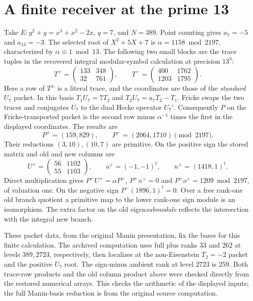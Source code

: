 \documentclass[11pt]{article}
\begin{document}
\section{A finite receiver at the prime 13}
Take $E:y^2+y=x^3+x^2-2x$, $q=7$, and $N=389$. Point counting gives
$a_7=-5$ and $a_{13}=-3$. The selected root of $X^2+5X+7$ is
$\alpha=1158\bmod 2197$, characterized by $\alpha\equiv1\bmod13$.
The following two small blocks are the trace tuples in the recovered
integral modular-symbol calculation at precision $13^3$:
\[
 T^+=\begin{pmatrix}133&348\\32&761\end{pmatrix},\qquad
 T^-=\begin{pmatrix}400&1762\\1203&1795\end{pmatrix}.
\]
Here a row of $T^\pm$ is a literal trace, and the coordinates
are those of the \emph{standard} $U_7$ packet. In this basis
$T_1U_7=7T_2$ and $T_2U_7=a_7T_2-T_1$. Fricke swaps the two traces
and conjugates $U_7$ to the dual Hecke operator $U_7'$. Consequently
$P$ on the Fricke-transported packet is the second row minus
$\alpha^{-1}$ times the first in the displayed coordinates. The results
are
\[
 P^+=(159,829),\qquad P^-=(2064,1710)\pmod {2197}.
\]
Their reductions $(3,10),(10,7)$ are primitive. On the positive
sign the stored matrix and old and new columns are
\[
 U^+=\begin{pmatrix}56&1102\\55&1103\end{pmatrix},\qquad
 o^+=(-1,-1)^t,\qquad n^+=(1418,1)^t .
\]
Direct multiplication gives $P^+U^+=\alpha P^+$, $P^+n^+=0$ and
$P^+o^+=1209\bmod2197$, of valuation one. On the negative sign
$P^-(1896,1)^t=0$. Over a free rank-one old branch quotient a
primitive map to the lower rank-one sign module is an isomorphism.
The extra factor on the old eigen\emph{submodule} reflects the
intersection with the integral new branch.

These packet data, from the original Manin presentation, fix the bases
for this finite calculation. The archived computation uses full plus
ranks $33$ and $262$ at levels $389,2723$, respectively, then
localizes at the non-Eisenstein $T_2=-2$ packet and the positive
$U_7$ root. The sign-minus ambient rank at level $2723$ is $259$.
Both trace-row products and the old column product above were checked
directly from the restored numerical arrays. This checks the arithmetic
of the displayed inputs; the full Manin-basis reduction is from the
original source computation.
\end{document}
